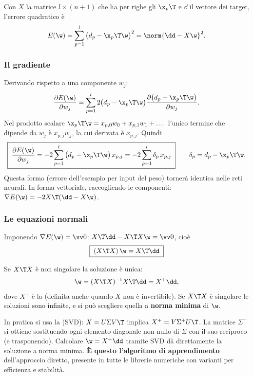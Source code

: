 Con $X$ la matrice $l\times(n+1)$ che ha per righe gli $\x_p\T$ e $\dd$ il vettore dei target, l'errore
quadratico è
\[
E(\w) = \sum_{p=1}^{l}\big(d_p-\x_p\T\w\big)^2 = \norm{\dd - X\w}^2 .
\]

\subsubsection{Il gradiente}
Derivando rispetto a una componente $w_j$:
\[
\frac{\partial E(\w)}{\partial w_j} = \sum_{p=1}^{l}2\big(d_p-\x_p\T\w\big)\frac{\partial\big(d_p-\x_p\T\w\big)}{\partial w_j}.
\]
Nel prodotto scalare $\x_p\T\w = x_{p,0}w_0 + x_{p,1}w_1+\dots$ l'unico termine che dipende da $w_j$ è
$x_{p,j}w_j$, la cui derivata è $x_{p,j}$. Quindi
\begin{equation}\label{eq:gradiente-lms}
\boxed{\;\frac{\partial E(\w)}{\partial w_j} = -2\sum_{p=1}^{l}\big(d_p-\x_p\T\w\big)\,x_{p,j} = -2\sum_{p=1}^{l}\delta_p\,x_{p,j}\;}
\qquad \delta_p = d_p - \x_p\T\w .
\end{equation}
Questa forma (errore dell'esempio per input del peso) tornerà identica nelle reti neurali. In forma vettoriale,
raccogliendo le componenti: $\nabla E(\w) = -2X\T(\dd - X\w)$.

\subsubsection{Le equazioni normali}
Imponendo $\nabla E(\w) = \vv0$: $X\T\dd - X\T X\w = \vv0$, cioè
\begin{equation}\label{eq:normali}
\boxed{\;(X\T X)\,\w = X\T\dd\;}
\end{equation}

\begin{teorema}
Se $X\T X$ è non singolare la soluzione è unica:
\[
\w = (X\T X)^{-1}X\T\dd = X^+\dd ,
\]
dove $X^+$ è la  (definita anche quando $X$ non è invertibile). Se
$X\T X$ è singolare le soluzioni sono infinite, e si può scegliere quella a \textbf{norma minima} di $\w$.
\end{teorema}

In pratica si usa la  (SVD): $X = U\Sigma V\T$ implica
$X^+ = V\Sigma^+U\T$. La matrice $\Sigma^+$ si ottiene sostituendo ogni elemento diagonale non nullo di $\Sigma$
con il suo reciproco (e trasponendo). Calcolare $\w = X^+\dd$ tramite SVD dà direttamente la soluzione a norma
minima. \textbf{È questo l'algoritmo di apprendimento} dell'approccio diretto, presente in tutte le librerie
numeriche con varianti per efficienza e stabilità.

